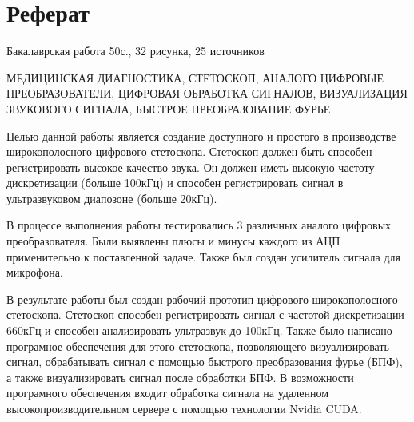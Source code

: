 \documentclass[../main.tex]{subfiles}
\begin{document}
\newpage
\section*{Реферат}

\par\noindent Бакалаврская работа 50с., 32 рисунка, 25 источников

МЕДИЦИНСКАЯ ДИАГНОСТИКА, СТЕТОСКОП, АНАЛОГО ЦИФРОВЫЕ ПРЕОБРАЗОВАТЕЛИ, ЦИФРОВАЯ ОБРАБОТКА СИГНАЛОВ, ВИЗУАЛИЗАЦИЯ ЗВУКОВОГО СИГНАЛА, БЫСТРОЕ ПРЕОБРАЗОВАНИЕ ФУРЬЕ

Целью данной работы является создание доступного и простого в производстве широкополосного цифрового стетоскопа. Стетоскоп должен быть способен регистрировать высокое качество звука. Он должен иметь высокую частоту дискретизации (больше 100кГц) и способен регистрировать сигнал в ультразвуковом диапозоне (больше 20кГц).

В процессе выполнения работы тестировались 3 различных аналого цифровых преобразователя. Были выявлены плюсы и минусы каждого из АЦП применительно к поставленной задаче. Также был создан усилитель сигнала для микрофона.

В результате работы был создан рабочий прототип цифрового широкополосного стетоскопа. Стетоскоп способен регистрировать сигнал с частотой дискретизации 660кГц и способен анализировать ультразвук до 100кГц. Также было написано програмное обеспечения для этого стетоскопа, позволяющего визуализировать сигнал, обрабатывать сигнал с помощью быстрого преобразования фурье (БПФ), а также визуализировать сигнал после обработки БПФ. В возможности програмного обеспечения входит обработка сигнала на удаленном высокопроизводительном сервере с помощью технологии Nvidia CUDA.

\clearpage
\normalsize
\newpage
\end{document}
